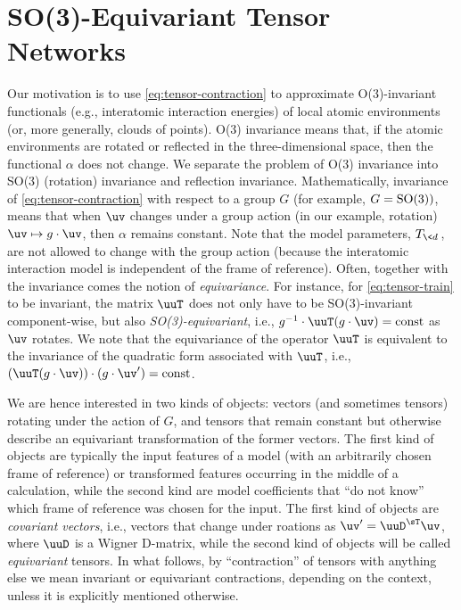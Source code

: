 \section{SO(3)-Equivariant Tensor Networks}
\label{sec:SO(3)-ETNs}

Our motivation is to use \eqref{eq:tensor-contraction} to approximate O(3)-invariant functionals (e.g., interatomic interaction energies) of local atomic environments (or, more generally, clouds of points).
O(3) invariance means that, if the atomic environments are rotated or reflected in the three-dimensional space, then the functional $\alpha$ does not change.
We separate the problem of O(3) invariance into SO(3) (rotation) invariance and reflection invariance.
Mathematically, invariance of \eqref{eq:tensor-contraction} with respect to a group $G$ (for example, $G={\rm SO(3)})$, means that when $\uv$ changes under a group action (in our example, rotation) $\uv \mapsto g\cdot\uv$, then $\alpha$ remains constant.
Note that the model parameters, $T_{\<d\>}$, are not allowed to change with the group action (because the interatomic interaction model is independent of the frame of reference).
Often, together with the invariance comes the notion of \emph{equivariance}.
For instance, for \eqref{eq:tensor-train} to be invariant, the matrix $\uuT$ does not only have to be SO(3)-invariant component-wise, but also \emph{SO(3)-equivariant}, i.e., $g^{-1} \cdot \uuT (g\cdot \uv) = {\rm const}$ as $\uv$ rotates.
We note that the equivariance of the operator $\uuT$ is equivalent to the invariance of the quadratic form associated with $\uuT$, i.e., $(\uuT (g\cdot \uv)) \cdot (g\cdot \uv') = {\rm const}$.

We are hence interested in two kinds of objects: vectors (and sometimes tensors) rotating under the action of $G$, and tensors that remain constant but otherwise describe an equivariant transformation of the former vectors.
The first kind of objects are typically the input features of a model (with an arbitrarily chosen frame of reference) or transformed features occurring in the middle of a calculation, while the second kind are model coefficients that ``do not know'' which frame of reference was chosen for the input.
The first kind of objects are \emph{covariant vectors}, i.e., vectors that change under roations as $\uv' = \uuD^\sT \uv$, where $\uuD$ is a Wigner D-matrix, while the second kind of objects will be called \emph{equivariant} tensors.
In what follows, by ``contraction'' of tensors with anything else we mean invariant or equivariant contractions, depending on the context, unless it is explicitly mentioned otherwise.

